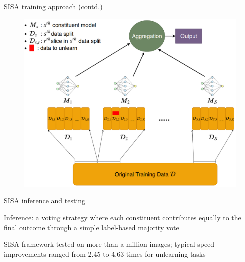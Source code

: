 \documentclass[12pt,aspectratio=169,handout]{beamer}
\begin{document}
\begin{frame}{SISA training approach (contd.)}

\begin{figure}
\includegraphics[width=0.7\linewidth]{img/unlearning2.png}
\end{figure}



\end{frame}



\begin{frame}{SISA inference and testing}

Inference: a voting strategy where each constituent contributes equally to the final outcome through a simple label-based majority vote

\bigskip

SISA framework tested on more than a million images; typical speed improvements ranged from 2.45 to 4.63-times for unlearning tasks \citep{Greengard.2022.ACM}



\end{frame}
\end{document}
